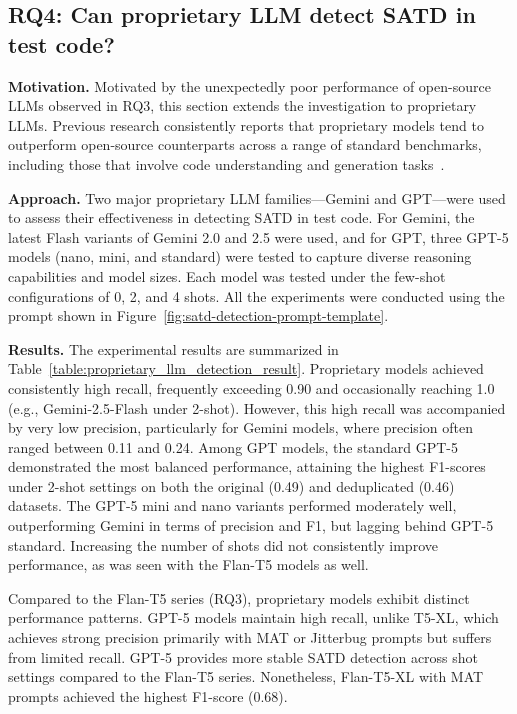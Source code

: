 \subsection{RQ4: Can proprietary LLM detect SATD in test code?}
\textbf{Motivation.} Motivated by the unexpectedly poor performance of open-source LLMs observed in RQ3, this section extends the investigation to proprietary LLMs. Previous research consistently reports that proprietary models tend to outperform open-source counterparts across a range of standard benchmarks, including those that involve code understanding and generation tasks~\cite{dvivedi2024comparative, mayer_can_2024, jimenez2023swe}.

\textbf{Approach.} Two major proprietary LLM families—Gemini and GPT—were used to assess their effectiveness in detecting SATD in test code. For Gemini, the latest Flash variants of Gemini 2.0 and 2.5 were used, and for GPT, three GPT-5 models (nano, mini, and standard) were tested to capture diverse reasoning capabilities and model sizes. Each model was tested under the few-shot configurations of 0, 2, and 4 shots. All the experiments were conducted using the prompt shown in Figure~\ref{fig:satd-detection-prompt-template}.




\textbf{Results.} The experimental results are summarized in Table~\ref{table:proprietary_llm_detection_result}. Proprietary models achieved consistently high recall, frequently exceeding 0.90 and occasionally reaching 1.0 (e.g., Gemini-2.5-Flash under 2-shot). However, this high recall was accompanied by very low precision, particularly for Gemini models, where precision often ranged between 0.11 and 0.24. Among GPT models, the standard GPT-5 demonstrated the most balanced performance, attaining the highest F1-scores under 2-shot settings on both the original (0.49) and deduplicated (0.46) datasets. The GPT-5 mini and nano variants performed moderately well, outperforming Gemini in terms of precision and F1, but lagging behind GPT-5 standard. Increasing the number of shots did not consistently improve performance, as was seen with the Flan-T5 models as well.

Compared to the Flan-T5 series (RQ3), proprietary models exhibit distinct performance patterns. GPT-5 models maintain high recall, unlike T5-XL, which achieves strong precision primarily with MAT or Jitterbug prompts but suffers from limited recall. GPT-5 provides more stable SATD detection across shot settings compared to the Flan-T5 series. Nonetheless, Flan-T5-XL with MAT prompts achieved the highest F1-score (0.68).

